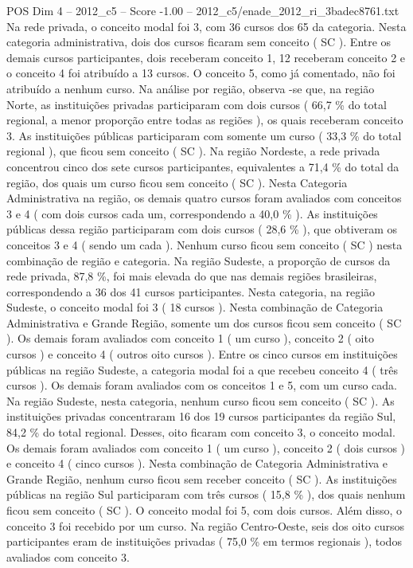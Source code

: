 \begin{textsample}{POS Dim 4 – 2012\_c5 – Score -1.00 – 2012\_c5/enade\_2012\_ri\_3badec8761.txt}
Na rede privada, o conceito modal foi 3, com 36 cursos dos 65 da categoria.
Nesta categoria administrativa, dois dos cursos ficaram sem conceito ( SC ).
Entre os demais cursos participantes, dois receberam conceito 1, 12 receberam conceito 2 e o conceito 4 foi atribuído a 13 cursos.
O conceito 5, como já comentado, não foi atribuído a nenhum curso.
Na análise por região, observa -se que, na região Norte, as instituições privadas participaram com dois cursos ( 66,7 \% do total regional, a menor proporção entre todas as regiões ), os quais receberam conceito 3.
As instituições públicas participaram com somente um curso ( 33,3 \% do total regional ), que ficou sem conceito ( SC ).
Na região Nordeste, a rede privada concentrou cinco dos sete cursos participantes, equivalentes a 71,4 \% do total da região, dos quais um curso ficou sem conceito ( SC ).
Nesta Categoria Administrativa na região, os demais quatro cursos foram avaliados com conceitos 3 e 4 ( com dois cursos cada um, correspondendo a 40,0 \% ).
As instituições públicas dessa região participaram com dois cursos ( 28,6 \% ), que obtiveram os conceitos 3 e 4 ( sendo um cada ).
Nenhum curso ficou sem conceito ( SC ) nesta combinação de região e categoria.
Na região Sudeste, a proporção de cursos da rede privada, 87,8 \%, foi mais elevada do que nas demais regiões brasileiras, correspondendo a 36 dos 41 cursos participantes.
Nesta categoria, na região Sudeste, o conceito modal foi 3 ( 18 cursos ).
Nesta combinação de Categoria Administrativa e Grande Região, somente um dos cursos ficou sem conceito ( SC ).
Os demais foram avaliados com conceito 1 ( um curso ), conceito 2 ( oito cursos ) e conceito 4 ( outros oito cursos ).
Entre os cinco cursos em instituições públicas na região Sudeste, a categoria modal foi a que recebeu conceito 4 ( três cursos ).
Os demais foram avaliados com os conceitos 1 e 5, com um curso cada.
Na região Sudeste, nesta categoria, nenhum curso ficou sem conceito ( SC ).
As instituições privadas concentraram 16 dos 19 cursos participantes da região Sul, 84,2 \% do total regional.
Desses, oito ficaram com conceito 3, o conceito modal.
Os demais foram avaliados com conceito 1 ( um curso ), conceito 2 ( dois cursos ) e conceito 4 ( cinco cursos ).
Nesta combinação de Categoria Administrativa e Grande Região, nenhum curso ficou sem receber conceito ( SC ).
As instituições públicas na região Sul participaram com três cursos ( 15,8 \% ), dos quais nenhum ficou sem conceito ( SC ).
O conceito modal foi 5, com dois cursos.
Além disso, o conceito 3 foi recebido por um curso.
Na região Centro-Oeste, seis dos oito cursos participantes eram de instituições privadas ( 75,0 \% em termos regionais ), todos avaliados com conceito 3.

\end{textsample}
